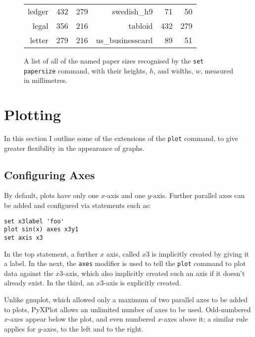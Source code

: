 \documentclass[a4paper,onecolumn,11pt]{book}
\begin{document}
\begin{figure}
\begin{tabular}{|rrr|rrr|}
                    ledger &    432 &    279 &       swedish\_h9 &     71 &     50 \\
                     legal &    356 &    216 &          tabloid &    432 &    279 \\
                    letter &    279 &    216 &  us\_businesscard &     89 &     51 \\
\hline
\end{tabular}
\caption{A list of all of the named paper sizes recognised by the \texttt{set papersize} command, with their heights, $h$, and widths, $w$, measured in millimetres.}
\label{paper_sizes}
\end{figure}

\section{Plotting}

In this section I outline some of the extensions of the \texttt{plot} command,
to give greater flexibility in the appearance of graphs.

\subsection{Configuring Axes}
\label{axis_extensions}\label{ranges_multiaxes}\label{multiple_axes}

By default, plots have only one $x$-axis and one $y$-axis. Further parallel
axes can be added and configured via statements such as:

\begin{verbatim}
set x3label 'foo'
plot sin(x) axes x3y1
set axis x3
\end{verbatim}

\noindent In the top statement, a further $x$ axis, called $x3$ is implicitly
created by giving it a label. In the next, the \texttt{axes} modifier is used
to tell the \texttt{plot} command to plot data against the $x3$-axis, which
also implicitly created such an axis if it doesn't already exist. In the third,
an $x3$-axis is explicitly created.

Unlike gnuplot, which allowed only a maximum of two parallel axes to be added
to plots, PyXPlot allows an unlimited number of axes to be used. Odd-numbered
$x$-axes appear below the plot, and even numbered $x$-axes above it; a similar
rule applies for $y$-axes, to the left and to the right.
\end{document}
